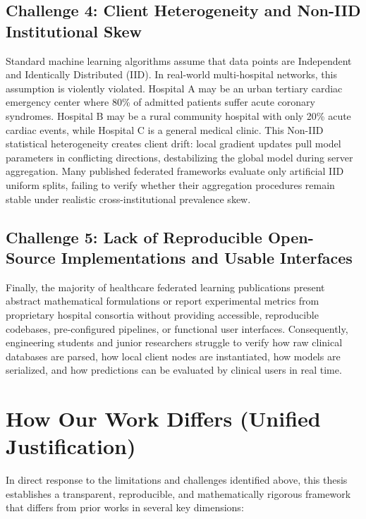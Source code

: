 \subsection{Challenge 4: Client Heterogeneity and Non-IID Institutional Skew}
Standard machine learning algorithms assume that data points are Independent and Identically Distributed (IID). In real-world multi-hospital networks, this assumption is violently violated. Hospital A may be an urban tertiary cardiac emergency center where 80\% of admitted patients suffer acute coronary syndromes. Hospital B may be a rural community hospital with only 20\% acute cardiac events, while Hospital C is a general medical clinic. This Non-IID statistical heterogeneity creates client drift: local gradient updates pull model parameters in conflicting directions, destabilizing the global model during server aggregation. Many published federated frameworks evaluate only artificial IID uniform splits, failing to verify whether their aggregation procedures remain stable under realistic cross-institutional prevalence skew.

\subsection{Challenge 5: Lack of Reproducible Open-Source Implementations and Usable Interfaces}
Finally, the majority of healthcare federated learning publications present abstract mathematical formulations or report experimental metrics from proprietary hospital consortia without providing accessible, reproducible codebases, pre-configured pipelines, or functional user interfaces. Consequently, engineering students and junior researchers struggle to verify how raw clinical databases are parsed, how local client nodes are instantiated, how models are serialized, and how predictions can be evaluated by clinical users in real time.

\section{How Our Work Differs (Unified Justification)}
\label{sec:how_work_differs}

In direct response to the limitations and challenges identified above, this thesis establishes a transparent, reproducible, and mathematically rigorous framework that differs from prior works in several key dimensions:


